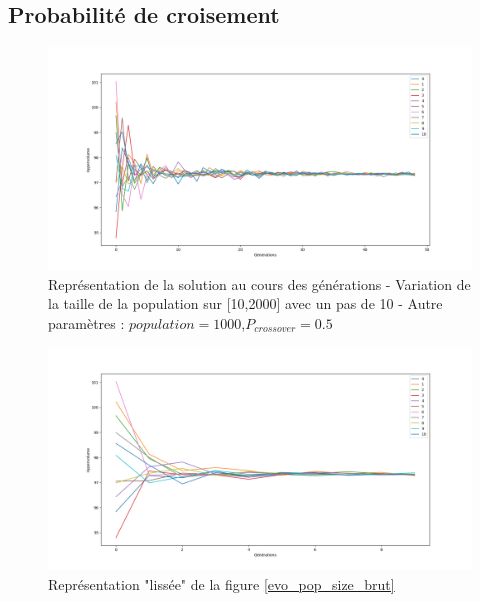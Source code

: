 \documentclass[12pt]{report}
\begin{document}
      \subsection{Probabilité de croisement}
      \begin{figure}[h]
        \centering
        \includegraphics[width=15cm]{img/crossover_sch_moy.png}
        \caption{Représentation de la solution au cours des générations - Variation de la taille de la population sur [10,2000] avec un pas de 10 - Autre paramètres : $population = 1000$,$P_{crossover} = 0.5$}
        \label{sch_crossover_moy}
      \end{figure}

      \begin{figure}[!]
        \centering
        \includegraphics[width=15cm]{img/crossover_sch_liss.png}
        \caption{Représentation "lissée" de la figure \ref{evo_pop_size_brut}}
        \label{sch_crossover_liss}
      \end{figure}
\end{document}
